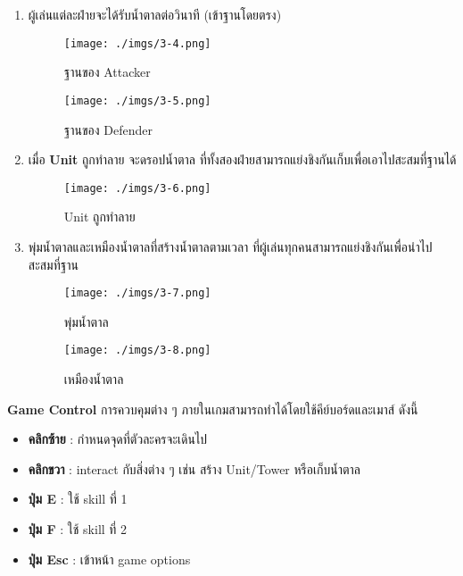 \documentclass[12pt,oneside,openright,a4paper]{cpe-thai-project}
\begin{document}
\begin{enumerate}
  \item ผู้เล่นแต่ละฝ่ายจะได้รับน้ำตาลต่อวินาที (เข้าฐานโดยตรง)
  \begin{figure}[H]\centering
    \begin{minipage}{.3\textwidth}
      \centering
      \texttt{[image: ./imgs/3-4.png]}
      \caption{ฐานของ Attacker}\label{fig:3-4}
    \end{minipage}
    \begin{minipage}{.3\textwidth}
      \centering
      \texttt{[image: ./imgs/3-5.png]}
      \caption{ฐานของ Defender}\label{fig:3-5}
    \end{minipage}
  \end{figure}

  \item เมื่อ \textbf{Unit} ถูกทำลาย จะดรอปน้ำตาล
  ที่ทั้งสองฝ่ายสามารถแย่งชิงกันเก็บเพื่อเอาไปสะสมที่ฐานได้
  \begin{figure}[H]\centering
    \texttt{[image: ./imgs/3-6.png]}
    \caption{Unit ถูกทำลาย}\label{fig:3-6}
  \end{figure}

  \item พุ่มน้ำตาลและเหมืองน้ำตาลที่สร้างน้ำตาลตามเวลา 
  ที่ผู้เล่นทุกคนสามารถแย่งชิงกันเพื่อนำไปสะสมที่ฐาน
  \begin{figure}[H]\centering
    \begin{minipage}{.3\textwidth}
      \centering
      \texttt{[image: ./imgs/3-7.png]}
      \caption{พุ่มน้ำตาล}\label{fig:3-7}
    \end{minipage}
    \begin{minipage}{.3\textwidth}
      \centering
      \texttt{[image: ./imgs/3-8.png]}
      \caption{เหมืองน้ำตาล}\label{fig:3-8}
    \end{minipage}
  \end{figure}
\end{enumerate}

\pagebreak
\textbf{Game Control}
การควบคุมต่าง ๆ ภายในเกมสามารถทำได้โดยใช้คีย์บอร์ดและเมาส์ ดังนี้
\begin{itemize}
  \item \textbf{คลิกซ้าย} : กำหนดจุดที่ตัวละครจะเดินไป
  \item \textbf{คลิกขวา} : interact กับสิ่งต่าง ๆ เช่น สร้าง Unit/Tower หรือเก็บน้ำตาล 
  \item \textbf{ปุ่ม E} : ใช้ skill ที่ 1
  \item \textbf{ปุ่ม F} : ใช้ skill ที่ 2
  \item \textbf{ปุ่ม Esc} : เข้าหน้า game options
  
\end{itemize}
\end{document}
